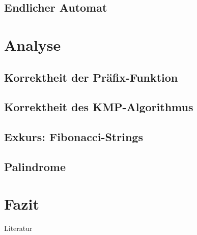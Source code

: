 \documentclass[xcolor=dvipsnames, aspectratio=1610]{beamer}
\begin{document}
%
%
%

\subsection{Endlicher Automat}

\section{Analyse}

\subsection{Korrektheit der Präfix-Funktion}
\subsection{Korrektheit des KMP-Algorithmus}
\subsection{Exkurs: Fibonacci-Strings}
\subsection{Palindrome}

\section{Fazit}

\begin{frame}{Literatur}
\printbibliography
\end{frame}

\end{document}
